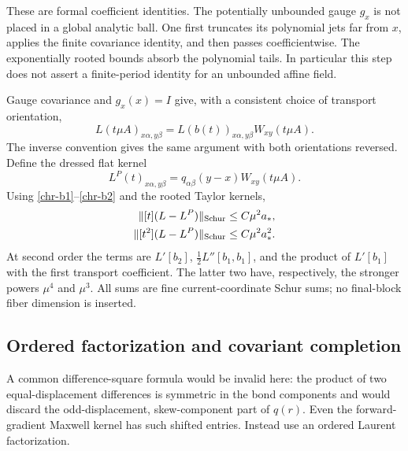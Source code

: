 These are formal coefficient identities.  The potentially
unbounded gauge \(g_x\) is not placed in a global analytic ball.
One first truncates its polynomial jets far from \(x\), applies
the finite covariance identity, and then passes coefficientwise.
The exponentially rooted bounds absorb the polynomial tails.
In particular this step does not assert a finite-period identity
for an unbounded affine field.

Gauge covariance and \(g_x(x)=I\) give, with a consistent choice
of transport orientation,
\begin{equation}
 L(t\mu A)_{x\alpha,y\beta}
        =L(b(t))_{x\alpha,y\beta}W_{xy}(t\mu A).
 \label{chr-gauge-identity}
\end{equation}
The inverse convention gives the same argument with both
orientations reversed.  Define the dressed flat kernel
\[
 L^P(t)_{x\alpha,y\beta}
     =q_{\alpha\beta}(y-x)W_{xy}(t\mu A).
\]
Using \eqref{chr-b1}--\eqref{chr-b2} and the rooted Taylor kernels,
\begin{align}
 \|[t](L-L^P)\|_{\mathrm{Schur}}
     &\leq C\mu^2a_*,
 \notag\\
 \|[t^2](L-L^P)\|_{\mathrm{Schur}}
     &\leq C\mu^2a_*^2 .
 \label{chr-peierls-error}
\end{align}
At second order the terms are \(L'[b_2]\),
\(\frac12L''[b_1,b_1]\), and the product of \(L'[b_1]\)
with the first transport coefficient.  The latter two have,
respectively, the stronger powers \(\mu^4\) and \(\mu^3\).
All sums are fine current-coordinate Schur sums; no final-block
fiber dimension is inserted.

\subsection{Ordered factorization and covariant completion}
\label{chr-factorization}

A common difference-square formula would be invalid here: the
product of two equal-displacement differences is symmetric in
the bond components and would discard the odd-displacement,
skew-component part of \(q(r)\).  Even the forward-gradient Maxwell
kernel has such shifted entries.  Instead use an ordered Laurent
factorization.

